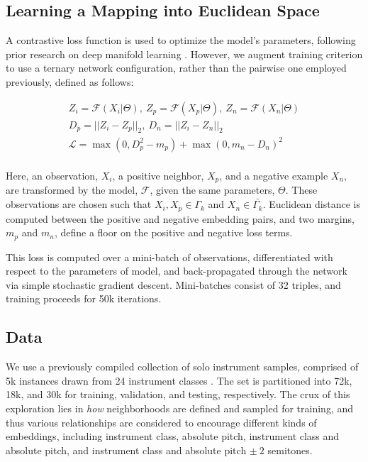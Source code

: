 \documentclass{article}
\begin{document}
\subsection{Learning a Mapping into Euclidean Space}

A contrastive loss function is used to optimize the model's parameters, following prior research on deep manifold learning \cite{hadsell2006drlim, humphrey2011nlse, humphrey2015dl4mir}.
However, we augment training criterion to use a ternary network configuration, rather than the pairwise one employed previously, defined as follows:

\begin{align*}
Z_i = \mathcal{F}(X_i | \Theta),~Z_p = \mathcal{F}(X_p | \Theta),~Z_n = \mathcal{F}(X_n | \Theta)\\
D_p = || Z_i - Z_p ||_2,~D_n = || Z_i - Z_n ||_2\\
\mathcal{L} = \max(0, D_p^2 - m_{p}) + \max(0, m_{n} - D_n)^2 \\
\end{align*}

Here, an observation, $X_i$, a positive neighbor, $X_p$, and a negative example $X_n$, are transformed by the model, $\mathcal{F}$, given the same parameters, $\Theta$.
These observations are chosen such that $X_i, X_p \in \Gamma_k$ and $X_n \in \bar{\Gamma_k}$.
Euclidean distance is computed between the positive and negative embedding pairs, and two margins, $m_p$ and $m_n$, define a floor on the positive and negative loss terms.

This loss is computed over a mini-batch of observations, differentiated with respect to the parameters of model, and back-propagated through the network via simple stochastic gradient descent.
Mini-batches consist of 32 triples, and training proceeds for 50k iterations.

\subsection{Data}

We use a previously compiled collection of solo instrument samples, comprised of 5k instances drawn from 24 instrument classes \cite{humphrey2015dl4mir}.
The set is partitioned into 72k, 18k, and 30k for training, validation, and testing, respectively.
The crux of this exploration lies in \emph{how} neighborhoods are defined and sampled for training, and thus various relationships are considered to encourage different kinds of embeddings, including instrument class, absolute pitch, instrument class and absolute pitch, and instrument class and absolute pitch $\pm~2$ semitones.
\end{document}
